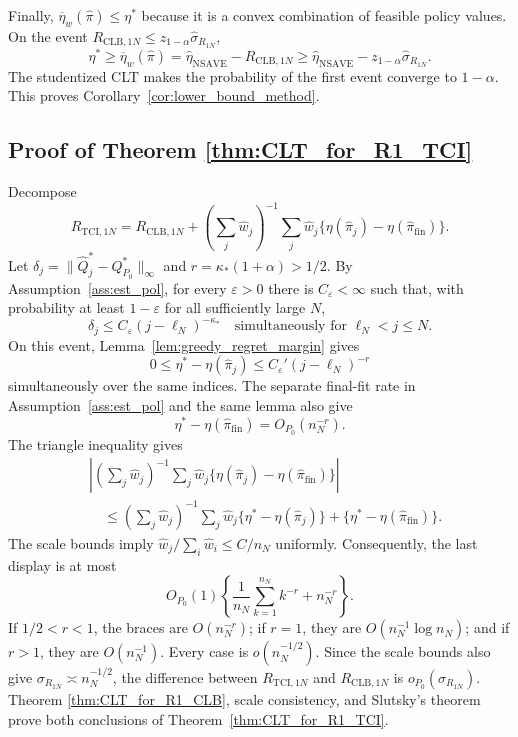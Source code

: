 \documentclass[12pt]{article}
\theoremstyle{remark}\newtheorem{remark}[theorem]{Remark}\theoremstyle{plain}
\begin{document}
Finally,
$\overline\eta_w(\widehat\pi)\leq\eta^*$ because it is a convex
combination of feasible policy values.  On the event
$R_{\mathrm{CLB},1N}
\leq z_{1-\alpha}\widehat\sigma_{R_{1N}}$,
\[
    \eta^*
    \geq\overline\eta_w(\widehat\pi)
    =\widehat\eta_{\mathrm{NSAVE}}-R_{\mathrm{CLB},1N}
    \geq
    \widehat\eta_{\mathrm{NSAVE}}
    -z_{1-\alpha}\widehat\sigma_{R_{1N}}.
\]
The studentized CLT makes the probability of the first event converge
to $1-\alpha$.  This proves
Corollary~\ref{cor:lower_bound_method}.

\subsection{Proof of Theorem \ref{thm:CLT_for_R1_TCI}}

Decompose
\[
    R_{\mathrm{TCI},1N}
    =
    R_{\mathrm{CLB},1N}
    +
    \left(\sum_j\widehat w_j\right)^{-1}
    \sum_j\widehat w_j
    \{\eta(\widehat\pi_j)-\eta(\widehat\pi_{\mathrm{fin}})\}.
\]
Let
$\delta_j=\|\widehat Q_j^*-Q_{P_0}^*\|_\infty$ and
$r=\kappa_*(1+\alpha)>1/2$.
By Assumption~\ref{ass:est_pol}, for every $\varepsilon>0$ there is
$C_\varepsilon<\infty$ such that, with probability at least
$1-\varepsilon$ for all sufficiently large $N$,
\[
    \delta_j\leq
    C_\varepsilon(j-\ell_N)^{-\kappa_*}
    \quad\text{simultaneously for }\ell_N<j\leq N.
\]
On this event, Lemma~\ref{lem:greedy_regret_margin} gives
\[
    0\leq\eta^*-\eta(\widehat\pi_j)
    \leq C_\varepsilon'(j-\ell_N)^{-r}
\]
simultaneously over the same indices.  The separate final-fit rate in
Assumption~\ref{ass:est_pol} and the same lemma also give
\[
    \eta^*-\eta(\widehat\pi_{\mathrm{fin}})
    =O_{P_0}(n_N^{-r}).
\]
The triangle inequality gives
\[
    \begin{aligned}
    &\left|
    \left(\sum_j\widehat w_j\right)^{-1}
    \sum_j\widehat w_j
    \{\eta(\widehat\pi_j)-\eta(\widehat\pi_{\mathrm{fin}})\}
    \right|\\
    &\quad\leq
    \left(\sum_j\widehat w_j\right)^{-1}
    \sum_j\widehat w_j
    \{\eta^*-\eta(\widehat\pi_j)\}
    +\{\eta^*-\eta(\widehat\pi_{\mathrm{fin}})\}.
    \end{aligned}
\]
The scale bounds imply
$\widehat w_j/\sum_i\widehat w_i\leq C/n_N$ uniformly.
Consequently, the last display is at most
\[
    O_{P_0}(1)
    \left\{
    \frac1{n_N}\sum_{k=1}^{n_N}k^{-r}
    +n_N^{-r}\right\}
\!.
\]
If $1/2<r<1$, the braces are $O(n_N^{-r})$; if $r=1$, they are
$O(n_N^{-1}\log n_N)$; and if $r>1$, they are $O(n_N^{-1})$.
Every case is $o(n_N^{-1/2})$.
Since the scale bounds also give
$\sigma_{R_{1N}}\asymp n_N^{-1/2}$, the difference between
$R_{\mathrm{TCI},1N}$ and $R_{\mathrm{CLB},1N}$ is
$o_{P_0}(\sigma_{R_{1N}})$.  Theorem
\ref{thm:CLT_for_R1_CLB}, scale consistency, and Slutsky's theorem
prove both conclusions of Theorem~\ref{thm:CLT_for_R1_TCI}.
\end{document}
